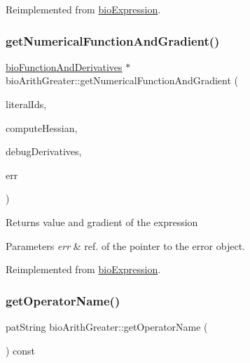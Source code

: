 Reimplemented from \hyperlink{classbio_expression_a3e4b4dca58dbbc6f0e411b30eb3f60b4}{bio\+Expression}.

\mbox{\label{classbio_arith_greater_acd768ff3dd4a85e234cb5fa7b5e1cf91}} 
\subsubsection{\texorpdfstring{get\+Numerical\+Function\+And\+Gradient()}{getNumericalFunctionAndGradient()}}
{\footnotesize\ttfamily \hyperlink{classbio_function_and_derivatives}{bio\+Function\+And\+Derivatives} $\ast$ bio\+Arith\+Greater\+::get\+Numerical\+Function\+And\+Gradient (\begin{DoxyParamCaption}\item[{vector$<$ pat\+U\+Long $>$}]{literal\+Ids,  }\item[{pat\+Boolean}]{compute\+Hessian,  }\item[{pat\+Boolean}]{debug\+Derivatives,  }\item[{pat\+Error $\ast$\&}]{err }\end{DoxyParamCaption})\hspace{0.3cm}{\ttfamily [virtual]}}

\begin{DoxyReturn}{Returns}
value and gradient of the expression 
\end{DoxyReturn}

\begin{DoxyParams}{Parameters}
{\em err} & ref. of the pointer to the error object. \\
\hline
\end{DoxyParams}


Reimplemented from \hyperlink{classbio_expression_a91c81ce80c9e972c913b10f5f3c1ed13}{bio\+Expression}.

\mbox{\label{classbio_arith_greater_a140169d1d84495e86d21dbd231c14f81}} 
\subsubsection{\texorpdfstring{get\+Operator\+Name()}{getOperatorName()}}
{\footnotesize\ttfamily pat\+String bio\+Arith\+Greater\+::get\+Operator\+Name (\begin{DoxyParamCaption}{ }\end{DoxyParamCaption}) const\hspace{0.3cm}{\ttfamily [virtual]}}

